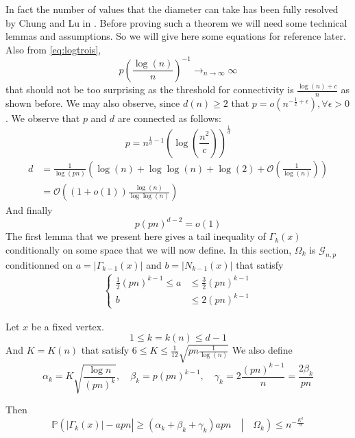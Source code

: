 In fact the number of values that the diameter can take has been fully resolved by Chung and Lu in \cite{ChungLu01}.
\newline
Before proving such a theorem we will need some technical lemmas and assumptions. So we will give here some equations for reference later.
Also from \eqref{eq:logtrois},
\begin{equation}
	p (\frac{\log(n)}{n})^{-1} \longrightarrow_{n \to \infty} \infty
\end{equation}
that should not be too surprising as the threshold for connectivity is $\frac{\log(n) + c}{n}$ as shown before.
We may also observe, since $d(n) \geq 2$ that $p = o(n^{-\frac{1}{2} +\epsilon}), \forall \epsilon > 0$.
We observe that $p$ and $d$ are connected as follows:
\begin{equation}
	p=n^{\frac{1}{d} - 1}(\log(\frac{n^2}{c}))^\frac{1}{d}
\end{equation}
\begin{align}\label{eq:pnd}
	d &= \frac{1}{\log(pn)}(\log(n) + \log \log (n) + \log(2) + \mathcal{O}(\frac{1}{\log(n)}))\\
	  &= \mathcal{O}((1+o(1))\frac{\log(n)}{\log\log(n)})
\end{align}
And finally
\begin{equation}
	p(pn)^{d-2} = o(1)
\end{equation}
The first lemma that we present here gives a tail inequality of $\Gamma_k(x)$ conditionally on some space that we will now define. 
In this section, $\Omega_k$ is $\mathcal{G}_{n, p}$ conditionned on $a = |\Gamma_{k-1}(x)|$ and $b = |N_{k-1}(x)|$ that satisfy
\begin{align}\label{eq:CondAB}
 \left\{\begin{array}{rl}
		 \frac{1}{2}(pn)^{k-1} \leq a &\leq \frac{3}{2}(pn)^{k-1} \\
		 			    b &\leq 2(pn)^{k-1}
	 \end{array}
	\right.
\end{align}
\begin{lemma}
	Let $x$ be a fixed vertex.
	\begin{equation}
		1 \leq k = k(n)  \leq d-1
	\end{equation}
	And $ K = K(n)$ that satisfy $ 6 \leq K \leq \frac{1}{12} \sqrt{pn\frac{1}{\log(n)}}$
	We also define
	\begin{equation}
		\alpha_k = K\sqrt{\frac{\log{n}}{(pn)^k}} , \quad \beta_k = p(pn)^{k-1}, \quad \gamma_k = 2\frac{(pn)^{k-1}}{n} = \frac{2\beta_k}{pn}
	\end{equation}

	Then
	\begin{equation}
		\mathbb{P}(|\Gamma_k(x)| - apn| \geq (\alpha_k + \beta_k + \gamma_k)apn \quad|\quad \Omega_k) \leq n^{-\frac{K^2}{9}}
	\end{equation}
\end{lemma}

